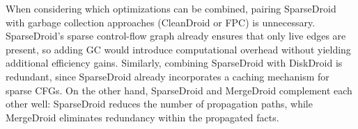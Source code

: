 When considering which optimizations can be combined, pairing SparseDroid with garbage collection approaches (CleanDroid or FPC) is unnecessary. SparseDroid’s sparse control-flow graph already ensures that only live edges are present, so adding GC would introduce computational overhead without yielding additional efficiency gains. Similarly, combining SparseDroid with DiskDroid is redundant, since SparseDroid already incorporates a caching mechanism for sparse CFGs. On the other hand, SparseDroid and MergeDroid complement each other well: SparseDroid reduces the number of propagation paths, while MergeDroid eliminates redundancy within the propagated facts.